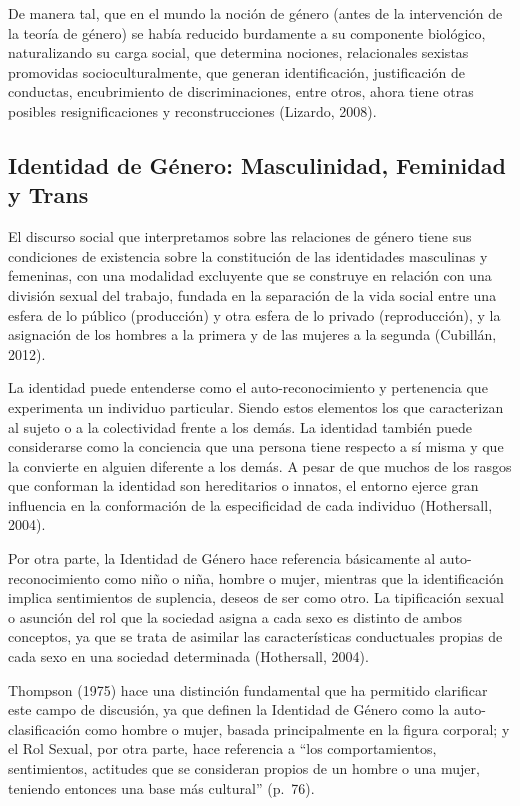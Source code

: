 De manera tal, que en el mundo la noción de género (antes de la intervención de
la teoría de género) se había reducido burdamente a su componente biológico,
naturalizando su carga social, que determina nociones, relacionales sexistas
promovidas socioculturalmente, que generan identificación, justificación de
conductas, encubrimiento de discriminaciones, entre otros, ahora tiene otras
posibles resignificaciones y reconstrucciones (Lizardo, 2008).

\subsection{Identidad de Género: Masculinidad, Feminidad y Trans}
El discurso social que interpretamos sobre las relaciones de género tiene sus
condiciones de existencia sobre la constitución de las identidades masculinas y
femeninas, con una modalidad excluyente que se construye en relación con una
división sexual del trabajo, fundada en la separación de la vida social entre
una esfera de lo público (producción) y otra esfera de lo privado
(reproducción), y la asignación de los hombres a la primera y de las mujeres a
la segunda (Cubillán, 2012).

La identidad puede entenderse como el auto-reconocimiento y pertenencia que
experimenta un individuo particular.
Siendo estos elementos los que caracterizan al sujeto o a la colectividad frente
a los demás.
La identidad también puede considerarse como la conciencia que una persona tiene
respecto a sí misma y que la convierte en alguien diferente a los demás.
A pesar de que muchos de los rasgos que conforman la identidad son hereditarios
o innatos, el entorno ejerce gran influencia en la conformación de la
especificidad de cada individuo (Hothersall, 2004).

Por otra parte, la Identidad de Género hace referencia básicamente al
auto-reconocimiento como niño o niña, hombre o mujer, mientras que la
identificación implica sentimientos de suplencia, deseos de ser como otro.
La tipificación sexual o asunción del rol que la sociedad asigna a cada sexo es
distinto de ambos conceptos, ya que se trata de asimilar las características
conductuales propias de cada sexo en una sociedad determinada (Hothersall,
2004).

Thompson (1975) hace una distinción fundamental que ha permitido clarificar este
campo de discusión, ya que definen la Identidad de Género como la
auto-clasificación como hombre o mujer, basada principalmente en la figura
corporal;
y el Rol Sexual, por otra parte, hace referencia a “los comportamientos,
sentimientos, actitudes que se consideran propios de un hombre
o una mujer, teniendo entonces una base más cultural” (p.~76).

